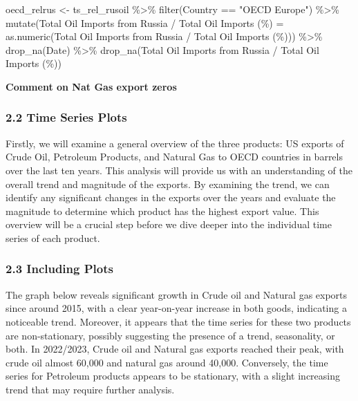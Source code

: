\documentclass[
]{article}
\newenvironment{Shaded}{\begin{snugshade}}{\end{snugshade}}
\newcommand{\AttributeTok}[1]{\textcolor[rgb]{0.77,0.63,0.00}{#1}}
\newcommand{\FunctionTok}[1]{\textcolor[rgb]{0.00,0.00,0.00}{#1}}
\newcommand{\NormalTok}[1]{#1}
\newcommand{\OtherTok}[1]{\textcolor[rgb]{0.56,0.35,0.01}{#1}}
\newcommand{\SpecialCharTok}[1]{\textcolor[rgb]{0.00,0.00,0.00}{#1}}
\newcommand{\StringTok}[1]{\textcolor[rgb]{0.31,0.60,0.02}{#1}}
\begin{document}
\begin{Shaded}
\begin{Highlighting}[]
\NormalTok{oecd\_relrus }\OtherTok{\textless{}{-}}\NormalTok{ ts\_rel\_rusoil }\SpecialCharTok{\%\textgreater{}\%}
  \FunctionTok{filter}\NormalTok{(Country }\SpecialCharTok{==} \StringTok{"OECD Europe"}\NormalTok{) }\SpecialCharTok{\%\textgreater{}\%}
  \FunctionTok{mutate}\NormalTok{(}\StringTok{\textasciigrave{}}\AttributeTok{Total Oil Imports from Russia / Total Oil Imports (\%)}\StringTok{\textasciigrave{}} \OtherTok{=} \FunctionTok{as.numeric}\NormalTok{(}\StringTok{\textasciigrave{}}\AttributeTok{Total Oil Imports from Russia / Total Oil Imports (\%)}\StringTok{\textasciigrave{}}\NormalTok{))  }\SpecialCharTok{\%\textgreater{}\%} 
  \FunctionTok{drop\_na}\NormalTok{(Date) }\SpecialCharTok{\%\textgreater{}\%} \FunctionTok{drop\_na}\NormalTok{(}\StringTok{\textasciigrave{}}\AttributeTok{Total Oil Imports from Russia / Total Oil Imports (\%)}\StringTok{\textasciigrave{}}\NormalTok{)}
\end{Highlighting}
\end{Shaded}

\textbf{Comment on Nat Gas export zeros}

\hypertarget{time-series-plots}{%
\subsubsection{2.2 Time Series Plots}\label{time-series-plots}}

Firstly, we will examine a general overview of the three products: US
exports of Crude Oil, Petroleum Products, and Natural Gas to OECD
countries in barrels over the last ten years. This analysis will provide
us with an understanding of the overall trend and magnitude of the
exports. By examining the trend, we can identify any significant changes
in the exports over the years and evaluate the magnitude to determine
which product has the highest export value. This overview will be a
crucial step before we dive deeper into the individual time series of
each product.

\hypertarget{including-plots}{%
\subsubsection{2.3 Including Plots}\label{including-plots}}

The graph below reveals significant growth in Crude oil and Natural gas
exports since around 2015, with a clear year-on-year increase in both
goods, indicating a noticeable trend. Moreover, it appears that the time
series for these two products are non-stationary, possibly suggesting
the presence of a trend, seasonality, or both. In 2022/2023, Crude oil
and Natural gas exports reached their peak, with crude oil almost 60,000
and natural gas around 40,000. Conversely, the time series for Petroleum
products appears to be stationary, with a slight increasing trend that
may require further analysis.
\end{document}
